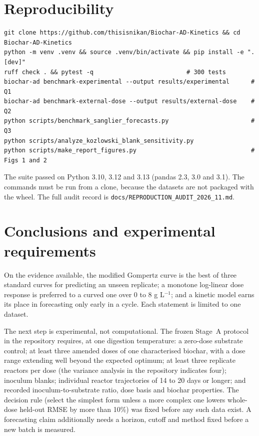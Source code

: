 \documentclass[10pt,a4paper]{article}
\begin{document}
\section{Reproducibility}
\begin{verbatim}
git clone https://github.com/thisisnikan/Biochar-AD-Kinetics && cd Biochar-AD-Kinetics
python -m venv .venv && source .venv/bin/activate && pip install -e ".[dev]"
ruff check . && pytest -q                          # 300 tests
biochar-ad benchmark-experimental --output results/experimental      # Q1
biochar-ad benchmark-external-dose --output results/external-dose    # Q2
python scripts/benchmark_sanglier_forecasts.py                       # Q3
python scripts/analyze_kozlowski_blank_sensitivity.py
python scripts/make_report_figures.py                                # Figs 1 and 2
\end{verbatim}
The suite passed on Python 3.10, 3.12 and 3.13 (pandas 2.3, 3.0 and 3.1). The commands must be run from a clone, because the datasets are not packaged with the wheel. The full audit record is \texttt{docs/REPRODUCTION\_AUDIT\_2026\_11.md}.

\section{Conclusions and experimental requirements}
On the evidence available, the modified Gompertz curve is the best of three standard curves for predicting an unseen replicate; a monotone log-linear dose response is preferred to a curved one over 0 to 8 g L$^{-1}$; and a kinetic model earns its place in forecasting only early in a cycle. Each statement is limited to one dataset.

The next step is experimental, not computational. The frozen Stage~A protocol in the repository requires, at one digestion temperature: a zero-dose substrate control; at least three amended doses of one characterised biochar, with a dose range extending well beyond the expected optimum; at least three replicate reactors per dose (the variance analysis in the repository indicates four); inoculum blanks; individual reactor trajectories of 14 to 20 days or longer; and recorded inoculum-to-substrate ratio, dose basis and biochar properties. The decision rule (select the simplest form unless a more complex one lowers whole-dose held-out RMSE by more than 10\%) was fixed before any such data exist. A forecasting claim additionally needs a horizon, cutoff and method fixed before a new batch is measured.
\end{document}
